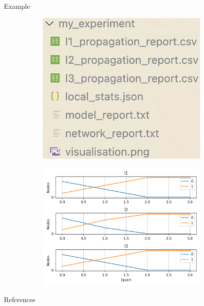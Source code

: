 \documentclass[final]{beamer}
\newlength{\sepwidth}
\newlength{\colwidth}
\newcommand{\separatorcolumn}{\begin{column}{\sepwidth}\end{column}}
\begin{document}
\begin{frame}[t, fragile]
\begin{columns}[t]
\begin{column}{\colwidth}
\begin{exampleblock}{Example}
\begin{figure}
    \centering
    \begin{subfigure}[b]{0.36\textwidth}
        \centering
        \includegraphics[width=\textwidth]{figures/output.png}
    \end{subfigure}
    \begin{subfigure}[b]{0.43\textwidth}
        \centering
        \includegraphics[width=\textwidth]{figures/visualisation.png}
    \end{subfigure}
\end{figure}

\end{exampleblock}

\begin{block}{References}
    \printbibliography
\end{block}

\vspace{30em}

\end{column}
\separatorcolumn

\end{columns}
\end{frame}
\end{document}
